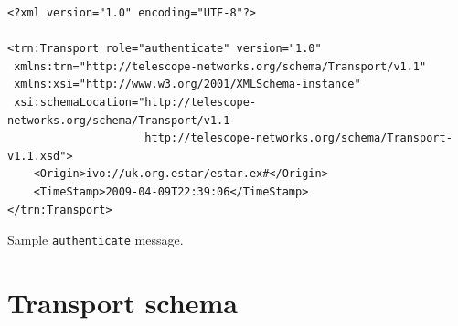 \documentclass[a4paper,11pt]{ivoa}
\begin{document}
\begin{listing*}
\begin{verbatim}
<?xml version="1.0" encoding="UTF-8"?>

<trn:Transport role="authenticate" version="1.0"
 xmlns:trn="http://telescope-networks.org/schema/Transport/v1.1"
 xmlns:xsi="http://www.w3.org/2001/XMLSchema-instance"
 xsi:schemaLocation="http://telescope-networks.org/schema/Transport/v1.1
                     http://telescope-networks.org/schema/Transport-v1.1.xsd">
    <Origin>ivo://uk.org.estar/estar.ex#</Origin>
    <TimeStamp>2009-04-09T22:39:06</TimeStamp>
</trn:Transport>
\end{verbatim}
\caption{Sample \texttt{authenticate} message.}
\label{lst:authenticate}
\end{listing*}

\appendix

\section{Transport schema}
\label{sec:transportschema}



\end{document}
